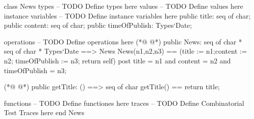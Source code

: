 \begin{vdmpp}[breaklines=true]
class News
types
-- TODO Define types here
values
-- TODO Define values here
instance variables
-- TODO Define instance variables here
public title: seq of char; 
public content: seq of char;
public timeOfPublish: Types`Date; 

operations
-- TODO Define operations here
(*@
\label{News:14}
@*)
public News: seq of char * seq of char * Types`Date ==> News
News(n1,n2,n3) == (title := n1;content := n2; timeOfPublish := n3; return self) 
post title = n1 and content = n2 and timeOfPublish = n3;
  
(*@
\label{getTitle:18}
@*)
public getTitle: () ==> seq of char
getTitle() == return title;

functions
-- TODO Define functiones here
traces
-- TODO Define Combinatorial Test Traces here
end News
\end{vdmpp}
